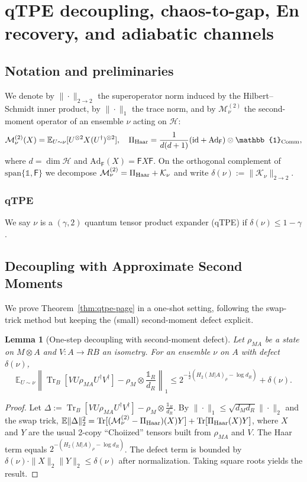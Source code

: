 \documentclass[11pt,a4paper]{article}
\newcommand{\Tr}{\operatorname{Tr}}
\theoremstyle{plain}
\newtheorem{lemma}[theorem]{Lemma}
\theoremstyle{definition}
\theoremstyle{remark}
\begin{document}
\clearpage
\section{qTPE decoupling, chaos-to-gap, En recovery, and adiabatic channels}
\label{app:qtpe}
\label{app:qtpe-decoupling}
\label{app:En-recovery}
\label{app:adiabatic-channels}
\subsection{Notation and preliminaries}
We denote by $\|\cdot\|_{2\to 2}$ the superoperator norm induced by the Hilbert--Schmidt inner product, by $\|\cdot\|_1$ the trace norm, and by $\mathcal{M}^{(2)}_\nu$ the second-moment operator of an ensemble $\nu$ acting on $\mathcal{H}$:
\[
\mathcal{M}^{(2)}_\nu(X) = \mathbb{E}_{U\sim\nu}[U^{\otimes 2}X(U^\dagger)^{\otimes 2}],\quad \Pi_{\rm Haar} =\frac{1}{d(d+1)}(\text{id} + \text{Ad}_{\mathsf{F}}) \otimes \mathbb{1}_{\rm Comm},
\]
where $d = \dim \mathcal{H}$ and $\text{Ad}_{\mathsf{F}}(X) = \mathsf{F}X\mathsf{F}$. On the orthogonal complement of $\text{span}\{\mathbb{1}, \mathsf{F}\}$ we decompose $\mathcal{M}^{(2)}_\nu = \Pi_{\rm Haar} + \mathcal{K}_\nu$ and write $\delta(\nu) := \|\mathcal{K}_\nu\|_{2\to 2}$.

\subsubsection{qTPE}
We say $\nu$ is a $(\gamma, 2)$ quantum tensor product expander (qTPE) if $\delta(\nu) \le 1 - \gamma$.

\subsection{Decoupling with Approximate Second Moments}
We prove Theorem~\ref{thm:qtpe-page} in a one-shot setting, following the swap-trick method but keeping the (small) second-moment defect explicit.

\begin{lemma}[One-step decoupling with second-moment defect]
Let $\rho_{MA}$ be a state on $M \otimes A$ and $V : A\to RB$ an isometry. For an ensemble $\nu$ on $A$ with defect $\delta(\nu)$,
\[
\mathbb{E}_{U\sim\nu} \left\| \Tr_B[V U \rho_{MA} U^\dagger V^\dagger] - \rho_M \otimes \frac{\mathbb{1}_R}{d_R} \right\|_1 \le 2^{-\frac{1}{2}(H_2(M|A)_\rho - \log d_R)} + \delta(\nu).
\]
\end{lemma}
\begin{proof}
Let $\Delta := \Tr_B[V U \rho_{MA} U^\dagger V^\dagger] - \rho_M \otimes \frac{\mathbb{1}_R}{d_R}$. By $\|\cdot\|_1 \le \sqrt{d_M d_R} \|\cdot\|_2$ and the swap trick, $\mathbb{E}\|\Delta\|_2^2 = \Tr[(\mathcal{M}^{(2)}_\nu - \Pi_{\rm Haar})(X) Y] + \Tr[\Pi_{\rm Haar}(X) Y]$, where $X$ and $Y$ are the usual 2-copy ``Choiized'' tensors built from $\rho_{MA}$ and $V$. The Haar term equals $2^{-(H_2(M|A)_\rho - \log d_R)}$. The defect term is bounded by $\delta(\nu)\cdot\|X\|_2\|Y\|_2 \le \delta(\nu)$ after normalization. Taking square roots yields the result.
\end{proof}
\end{document}
